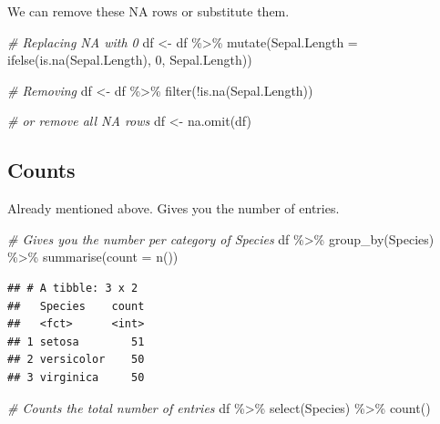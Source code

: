 \documentclass[
]{book}
\newenvironment{Shaded}{\begin{snugshade}}{\end{snugshade}}
\newcommand{\AttributeTok}[1]{\textcolor[rgb]{0.77,0.63,0.00}{#1}}
\newcommand{\CommentTok}[1]{\textcolor[rgb]{0.56,0.35,0.01}{\textit{#1}}}
\newcommand{\DecValTok}[1]{\textcolor[rgb]{0.00,0.00,0.81}{#1}}
\newcommand{\FunctionTok}[1]{\textcolor[rgb]{0.00,0.00,0.00}{#1}}
\newcommand{\NormalTok}[1]{#1}
\newcommand{\OtherTok}[1]{\textcolor[rgb]{0.56,0.35,0.01}{#1}}
\newcommand{\SpecialCharTok}[1]{\textcolor[rgb]{0.00,0.00,0.00}{#1}}
\begin{document}
We can remove these NA rows or substitute them.

\begin{Shaded}
\begin{Highlighting}[]
\CommentTok{\# Replacing NA with 0}
\NormalTok{df }\OtherTok{\textless{}{-}}\NormalTok{ df }\SpecialCharTok{\%\textgreater{}\%} 
  \FunctionTok{mutate}\NormalTok{(}\AttributeTok{Sepal.Length =} \FunctionTok{ifelse}\NormalTok{(}\FunctionTok{is.na}\NormalTok{(Sepal.Length), }\DecValTok{0}\NormalTok{, Sepal.Length))}

\CommentTok{\# Removing}
\NormalTok{df }\OtherTok{\textless{}{-}}\NormalTok{ df }\SpecialCharTok{\%\textgreater{}\%} 
  \FunctionTok{filter}\NormalTok{(}\SpecialCharTok{!}\FunctionTok{is.na}\NormalTok{(Sepal.Length))}

\CommentTok{\# or remove all NA rows}
\NormalTok{df }\OtherTok{\textless{}{-}} \FunctionTok{na.omit}\NormalTok{(df)}
\end{Highlighting}
\end{Shaded}

\hypertarget{counts}{%
\subsection{Counts}\label{counts}}

Already mentioned above.
Gives you the number of entries.

\begin{Shaded}
\begin{Highlighting}[]
\CommentTok{\# Gives you the number per category of Species}
\NormalTok{df }\SpecialCharTok{\%\textgreater{}\%} 
  \FunctionTok{group\_by}\NormalTok{(Species) }\SpecialCharTok{\%\textgreater{}\%} 
  \FunctionTok{summarise}\NormalTok{(}\AttributeTok{count =} \FunctionTok{n}\NormalTok{())}
\end{Highlighting}
\end{Shaded}

\begin{verbatim}
## # A tibble: 3 x 2
##   Species    count
##   <fct>      <int>
## 1 setosa        51
## 2 versicolor    50
## 3 virginica     50
\end{verbatim}

\begin{Shaded}
\begin{Highlighting}[]
\CommentTok{\# Counts the total number of entries}
\NormalTok{df }\SpecialCharTok{\%\textgreater{}\%} 
  \FunctionTok{select}\NormalTok{(Species) }\SpecialCharTok{\%\textgreater{}\%} 
  \FunctionTok{count}\NormalTok{()}
\end{Highlighting}
\end{Shaded}
\end{document}
